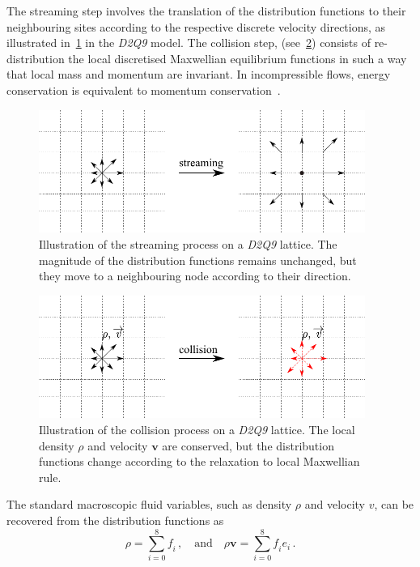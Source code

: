 The streaming step involves the translation of the distribution functions to 
their neighbouring sites according to the respective discrete velocity 
directions, as illustrated in~\cref{fig:stream} in the \textit{D2Q9} model. The 
collision step, (see~\cref{fig:collision}) consists of re-distribution the 
local discretised Maxwellian equilibrium functions in such a way that 
local mass and momentum are invariant. In incompressible flows, energy 
conservation is equivalent to momentum conservation~\citep{He1997}.

\begin{figure}[htbp]
	\centering
	\includegraphics[width=0.95\textwidth]{stream}
	\caption[Illustration of the streaming process on a \textit{D2Q9} 
	lattice]{Illustration of the streaming process on a \textit{D2Q9} lattice. 
	The magnitude of the distribution functions remains unchanged, but they 
	move to a neighbouring node according to their direction.}
	\label{fig:stream}
\end{figure}

\begin{figure}[htbp]
	\centering
	\includegraphics[width=0.95\textwidth]{collision}
	\caption[Illustration of the collision process on a \textit{D2Q9} 
	lattice]{Illustration of the collision process on a \textit{D2Q9} lattice. 
	The local density $\rho$ and velocity $\mathbf{v}$ are conserved, but the 
	distribution functions change according to the relaxation to local 
	Maxwellian rule.}
	\label{fig:collision}
\end{figure} 

The standard macroscopic fluid variables, such as density $\rho$ and velocity 
$\mathbf{\mathit{ v}}$, can be recovered from the distribution functions as
%
\begin{equation}
	\rho = \sum\limits_{\mathit{i}=0}^{8}{\mathit{f_i}}\,, \quad \mbox{and} 
	\quad \rho \mathbf{v} 
	= \sum\limits_{\mathit{i}=0}^{8}{\mathit{f_i}}\mathbf{\mathit{e_i}}\,.
\end{equation}

